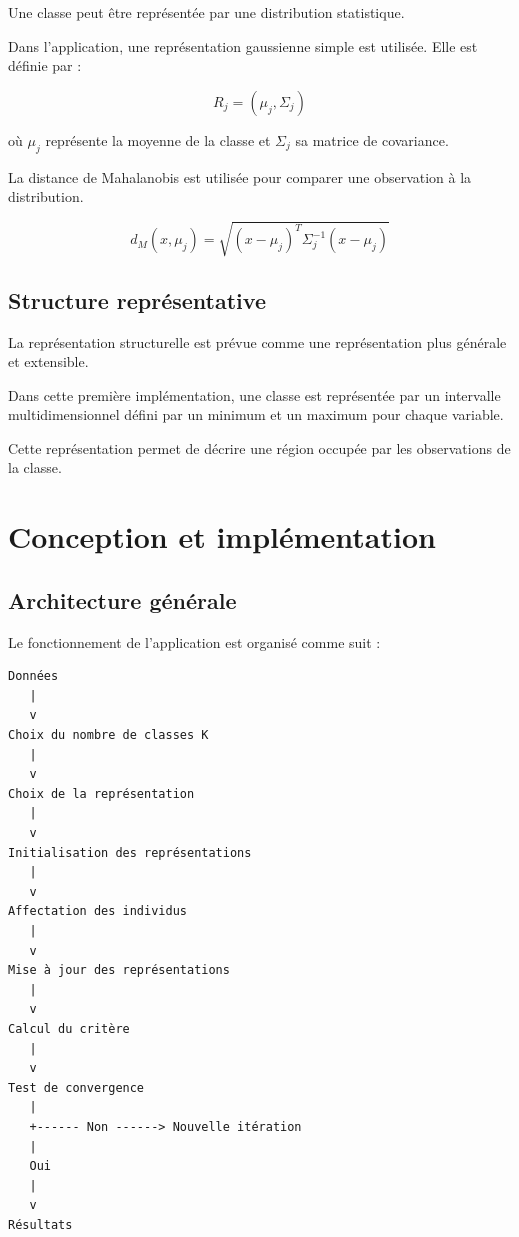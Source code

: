 \documentclass[12pt,a4paper]{report}
\begin{document}
Une classe peut être représentée par une distribution statistique.

Dans l'application, une représentation gaussienne simple est utilisée.
Elle est définie par :

\[
R_j = (\mu_j,\Sigma_j)
\]

où $\mu_j$ représente la moyenne de la classe et $\Sigma_j$ sa matrice
de covariance.

La distance de Mahalanobis est utilisée pour comparer une observation
à la distribution.

\[
d_M(x,\mu_j)
=
\sqrt{
(x-\mu_j)^T
\Sigma_j^{-1}
(x-\mu_j)
}
\]

\section{Structure représentative}

La représentation structurelle est prévue comme une représentation
plus générale et extensible.

Dans cette première implémentation, une classe est représentée par
un intervalle multidimensionnel défini par un minimum et un maximum
pour chaque variable.

Cette représentation permet de décrire une région occupée par les
observations de la classe.


\chapter{Conception et implémentation}

\section{Architecture générale}

Le fonctionnement de l'application est organisé comme suit :

\begin{verbatim}
Données
   |
   v
Choix du nombre de classes K
   |
   v
Choix de la représentation
   |
   v
Initialisation des représentations
   |
   v
Affectation des individus
   |
   v
Mise à jour des représentations
   |
   v
Calcul du critère
   |
   v
Test de convergence
   |
   +------ Non ------> Nouvelle itération
   |
   Oui
   |
   v
Résultats
\end{verbatim}
\end{document}
